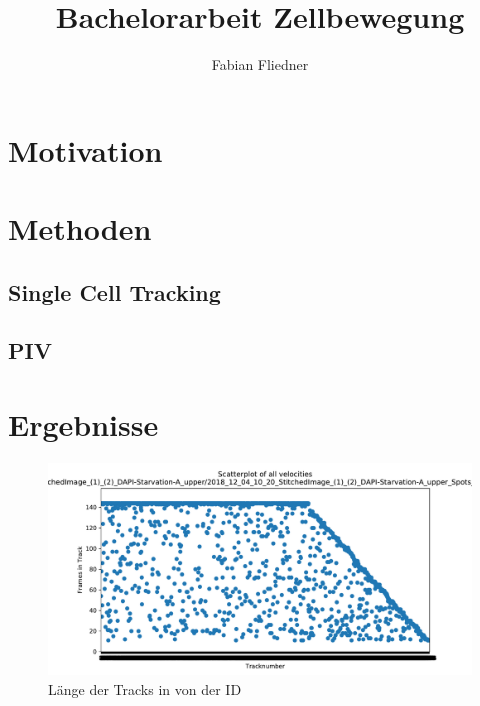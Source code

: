 \documentclass[]{article}
\title{Bachelorarbeit Zellbewegung}
\author{Fabian Fliedner}
\begin{document}
\maketitle
\begin{abstract}

\end{abstract}

\section{Motivation}
\section{Methoden}
\subsection{Single Cell Tracking}
\subsection{PIV}
\section{Ergebnisse}
\begin{figure}
	\centering
	\includegraphics[width=0.7\linewidth]{BildDateien/length_of_all_tracks}
	\caption[Tracklänge nach ID]{Länge der Tracks in von der ID}
	\label{fig:lengthofalltracks}
\end{figure}
\end{document}
